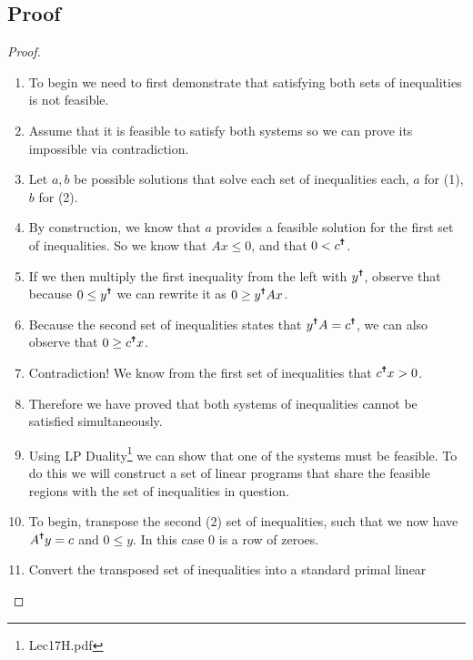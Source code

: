 \documentclass{article}
\begin{document}
\subsection{Proof}
\begin{proof}
      \begin{enumerate}
            \item To begin we need to first demonstrate that satisfying both sets of
            inequalities is not feasible. 
            \item Assume that it is feasible to satisfy both systems so we can prove its
            impossible via contradiction. 
            \item Let \(a, b\) be possible solutions that solve each set of inequalities
            each, \(a\) for (1), \(b\) for (2). 
            \item By construction, we know that \(a\) provides a feasible solution for the
            first set of inequalities. So we know that \(A x \leq 0\), and that
            \(0 < c^{\text{\Cross{}}}\).
            \item If we then multiply the first inequality from the left with
            \(y^{\text{\Cross{}}}\), observe that because \(0 \leq y^{\text{\Cross{}}}\)
            we can rewrite it as \(0 \geq y^{\text{\Cross{}}} A x \).
            \item Because the second set of inequalities states that \(y^{\text{\Cross{}}}
            A = c^{\text{\Cross{}}}\), we can also observe that \(0 \geq
            c^{\text{\Cross{}}} x\).
            \item Contradiction! We know from the first set of inequalities that
            \(c^{\text{\Cross{}}} x > 0\).
            \item Therefore we have proved that both systems of inequalities cannot be
            satisfied simultaneously. 
            \item Using LP Duality\footnote{Lec17H.pdf} we can show that one of the
            systems must be feasible. To do this we will construct a set of linear
            programs that share the feasible regions with the set of inequalities in
            question. 
            \item To begin, transpose the second (2) set of inequalities, such that we now
            have \(A^{\text{\Cross{}}}y = c\) and \(0 \leq y\). In this case 0 is a row of
            zeroes. 
            \item Convert the transposed set of inequalities into a standard primal linear

\end{enumerate}
\end{proof}
\end{document}
